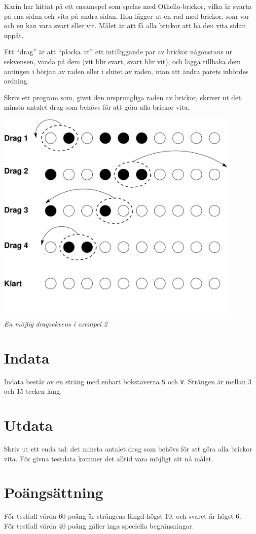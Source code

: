 
Karin har hittat på ett ensamspel som spelas med Othello-brickor, vilka är
svarta på ena sidan och vita på andra sidan. Hon lägger ut en rad med
brickor, som var och en kan vara svart eller vit. Målet är att få alla brickor att ha den vita sidan uppåt.

Ett ``drag'' är att ``plocka ut'' ett intilliggande par av brickor
någonstans ur sekvensen, vända på dem (vit blir svart, svart blir
vit), och lägga tillbaka dem antingen i början av raden eller i slutet av
raden, utan att ändra parets inbördes ordning.

Skriv ett program som, givet den ursprungliga raden av brickor, 
skriver ut det minsta antalet drag som behövs för
att göra alla brickor vita.

\begin{center}
\includegraphics[width=12cm]{brickorbild.pdf}\\
{\em En möjlig dragsekvens i exempel 2}
\end{center}

\section*{Indata}

Indata består av en sträng med enbart bokstäverna \texttt S och \texttt V.
Strängen är mellan 3 och 15 tecken lång.

\section*{Utdata}

Skriv ut ett enda tal: det minsta antalet drag som behövs för
att göra alla brickor vita. För givna testdata kommer det alltid vara
möjligt att nå målet.

\section*{Poängsättning}
För testfall värda $60$ poäng är strängens längd högst 10, och svaret är högst 6.\\
För testfall värda $40$ poäng gäller inga speciella begränsningar.
